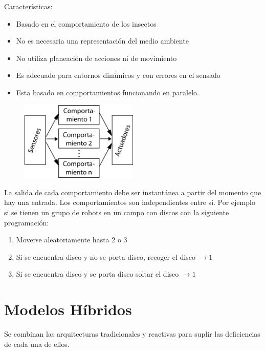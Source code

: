Características:

\begin{itemize}
	\item[\textbullet] Basado en el comportamiento de los insectos
	\item[\textbullet] No es necesaria una representación del medio ambiente
	\item[\textbullet] No utiliza planeación de acciones ni de movimiento
	\item[\textbullet] Es adecuado para entornos dinámicos y con errores en el sensado
	\item[\textbullet] Esta basado en comportamientos funcionando en paralelo.
\end{itemize}

\newpage

\begin{figure}[h!]
	\centering
	\includegraphics[width=0.5\textwidth]{images/img5.png}
	\label{figura6}
\end{figure}

La salida de cada comportamiento debe ser instantánea a partir del momento que hay una entrada.
Los comportamientos son independientes entre si.
Por ejemplo si se tienen un grupo de robots en un campo con discos con la siguiente programación:

\begin{enumerate}
	\item Moverse aleatoriamente hasta 2 o 3 
	\item Si se encuentra disco y no se porta disco, recoger el disco $\rightarrow1$
	\item Si se encuentra disco y se porta disco soltar el disco $\rightarrow1$
\end{enumerate}



\section{Modelos Híbridos}

Se combinan las arquitecturas tradicionales y reactivas para suplir las deficiencias de cada una de ellos.


